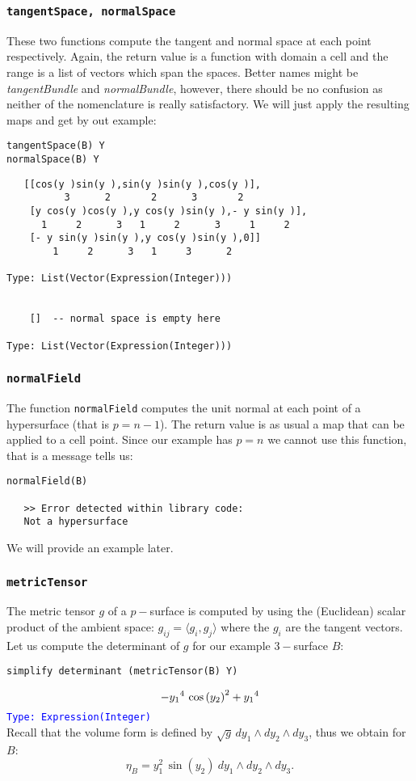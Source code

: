 \documentclass[12pt,a4paper]{article}
\newcommand{\type}[1]{\textcolor{blue}{\tt\tiny #1}}
\begin{document}
\subsubsection{\tt tangentSpace, normalSpace}
These two functions compute the tangent and normal space at each point
respectively. Again, the return value is a function with domain a 
cell and the range is a list of vectors which span the spaces. Better
names might be {\em tangentBundle} and {\em normalBundle}, however,  
there should be no confusion as neither of the nomenclature is really 
satisfactory.
We will just apply the resulting maps and get by out example:
\begin{lstlisting}
tangentSpace(B) Y
normalSpace(B) Y
\end{lstlisting}
\scriptsize
\begin{verbatim}
   [[cos(y )sin(y ),sin(y )sin(y ),cos(y )],
          3      2       2      3       2
    [y cos(y )cos(y ),y cos(y )sin(y ),- y sin(y )],
      1     2      3   1     2      3     1     2
    [- y sin(y )sin(y ),y cos(y )sin(y ),0]]
        1     2      3   1     3      2

Type: List(Vector(Expression(Integer)))


    []  -- normal space is empty here

Type: List(Vector(Expression(Integer)))      
\end{verbatim}
\normalsize
\subsubsection{\tt normalField}
The function {\tt normalField} computes the unit normal at each point
of a hypersurface (that is $p=n-1$). The return value is as usual 
a map that can be applied to a cell point. Since our example has
$p=n$ we cannot use this function, that is a message tells us:
\begin{verbatim}
normalField(B) 
 
   >> Error detected within library code:
   Not a hypersurface
\end{verbatim} 
We will provide an example later.
%
\subsubsection{\tt metricTensor}
The metric tensor $g$ of a $p-$surface is computed by using the
(Euclidean) scalar product of the ambient space: 
$g_{ij}=\langle g_i,g_j\rangle$ where the $g_i$ are the tangent
vectors.
Let us compute the determinant of $g$ for our example $3-$surface
$B$:
\begin{lstlisting}
simplify determinant (metricTensor(B) Y)
\end{lstlisting}
\begin{displaymath}
-{{{{y \sb {1}}} \sp {4}} \  {{{\cos 
\left(
{{y \sb {2}}} 
\right)}}
\sp {2}}}+{{{y \sb {1}}} \sp {4}} 
\end{displaymath}
\type{Type: Expression(Integer)} \\
Recall that the volume form is defined by 
$\sqrt{g}\, dy_1\wedge dy_2\wedge dy_3$, thus we obtain for $B$:
\begin{displaymath}
  \eta_B = y_1^2 \, \sin(y_2)\ dy_1\wedge dy_2\wedge dy_3.
\end{displaymath}
%
\end{document}
